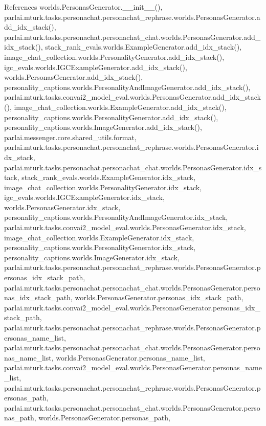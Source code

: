 References worlds.\+Personas\+Generator.\+\_\+\+\_\+init\+\_\+\+\_\+(), parlai.\+mturk.\+tasks.\+personachat.\+personachat\+\_\+rephrase.\+worlds.\+Personas\+Generator.\+add\+\_\+idx\+\_\+stack(), parlai.\+mturk.\+tasks.\+personachat.\+personachat\+\_\+chat.\+worlds.\+Personas\+Generator.\+add\+\_\+idx\+\_\+stack(), stack\+\_\+rank\+\_\+evals.\+worlds.\+Example\+Generator.\+add\+\_\+idx\+\_\+stack(), image\+\_\+chat\+\_\+collection.\+worlds.\+Personality\+Generator.\+add\+\_\+idx\+\_\+stack(), igc\+\_\+evals.\+worlds.\+I\+G\+C\+Example\+Generator.\+add\+\_\+idx\+\_\+stack(), worlds.\+Personas\+Generator.\+add\+\_\+idx\+\_\+stack(), personality\+\_\+captions.\+worlds.\+Personality\+And\+Image\+Generator.\+add\+\_\+idx\+\_\+stack(), parlai.\+mturk.\+tasks.\+convai2\+\_\+model\+\_\+eval.\+worlds.\+Personas\+Generator.\+add\+\_\+idx\+\_\+stack(), image\+\_\+chat\+\_\+collection.\+worlds.\+Example\+Generator.\+add\+\_\+idx\+\_\+stack(), personality\+\_\+captions.\+worlds.\+Personality\+Generator.\+add\+\_\+idx\+\_\+stack(), personality\+\_\+captions.\+worlds.\+Image\+Generator.\+add\+\_\+idx\+\_\+stack(), parlai.\+messenger.\+core.\+shared\+\_\+utils.\+format, parlai.\+mturk.\+tasks.\+personachat.\+personachat\+\_\+rephrase.\+worlds.\+Personas\+Generator.\+idx\+\_\+stack, parlai.\+mturk.\+tasks.\+personachat.\+personachat\+\_\+chat.\+worlds.\+Personas\+Generator.\+idx\+\_\+stack, stack\+\_\+rank\+\_\+evals.\+worlds.\+Example\+Generator.\+idx\+\_\+stack, image\+\_\+chat\+\_\+collection.\+worlds.\+Personality\+Generator.\+idx\+\_\+stack, igc\+\_\+evals.\+worlds.\+I\+G\+C\+Example\+Generator.\+idx\+\_\+stack, worlds.\+Personas\+Generator.\+idx\+\_\+stack, personality\+\_\+captions.\+worlds.\+Personality\+And\+Image\+Generator.\+idx\+\_\+stack, parlai.\+mturk.\+tasks.\+convai2\+\_\+model\+\_\+eval.\+worlds.\+Personas\+Generator.\+idx\+\_\+stack, image\+\_\+chat\+\_\+collection.\+worlds.\+Example\+Generator.\+idx\+\_\+stack, personality\+\_\+captions.\+worlds.\+Personality\+Generator.\+idx\+\_\+stack, personality\+\_\+captions.\+worlds.\+Image\+Generator.\+idx\+\_\+stack, parlai.\+mturk.\+tasks.\+personachat.\+personachat\+\_\+rephrase.\+worlds.\+Personas\+Generator.\+personas\+\_\+idx\+\_\+stack\+\_\+path, parlai.\+mturk.\+tasks.\+personachat.\+personachat\+\_\+chat.\+worlds.\+Personas\+Generator.\+personas\+\_\+idx\+\_\+stack\+\_\+path, worlds.\+Personas\+Generator.\+personas\+\_\+idx\+\_\+stack\+\_\+path, parlai.\+mturk.\+tasks.\+convai2\+\_\+model\+\_\+eval.\+worlds.\+Personas\+Generator.\+personas\+\_\+idx\+\_\+stack\+\_\+path, parlai.\+mturk.\+tasks.\+personachat.\+personachat\+\_\+rephrase.\+worlds.\+Personas\+Generator.\+personas\+\_\+name\+\_\+list, parlai.\+mturk.\+tasks.\+personachat.\+personachat\+\_\+chat.\+worlds.\+Personas\+Generator.\+personas\+\_\+name\+\_\+list, worlds.\+Personas\+Generator.\+personas\+\_\+name\+\_\+list, parlai.\+mturk.\+tasks.\+convai2\+\_\+model\+\_\+eval.\+worlds.\+Personas\+Generator.\+personas\+\_\+name\+\_\+list, parlai.\+mturk.\+tasks.\+personachat.\+personachat\+\_\+rephrase.\+worlds.\+Personas\+Generator.\+personas\+\_\+path, parlai.\+mturk.\+tasks.\+personachat.\+personachat\+\_\+chat.\+worlds.\+Personas\+Generator.\+personas\+\_\+path, worlds.\+Personas\+Generator.\+personas\+\_\+path, 